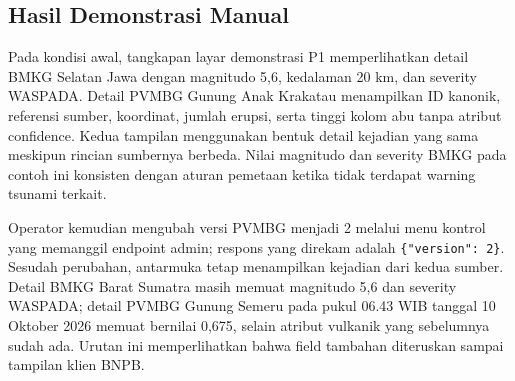 \subsection{Hasil Demonstrasi Manual}
Pada kondisi awal, tangkapan layar demonstrasi P1 memperlihatkan detail BMKG Selatan Jawa dengan magnitudo 5,6, kedalaman 20 km, dan severity WASPADA. Detail PVMBG Gunung Anak Krakatau menampilkan ID kanonik, referensi sumber, koordinat, jumlah erupsi, serta tinggi kolom abu tanpa atribut confidence. Kedua tampilan menggunakan bentuk detail kejadian yang sama meskipun rincian sumbernya berbeda. Nilai magnitudo dan severity BMKG pada contoh ini konsisten dengan aturan pemetaan ketika tidak terdapat warning tsunami terkait.


Operator kemudian mengubah versi PVMBG menjadi 2 melalui menu kontrol yang memanggil endpoint admin; respons yang direkam adalah \verb|{"version": 2}|. Sesudah perubahan, antarmuka tetap menampilkan kejadian dari kedua sumber. Detail BMKG Barat Sumatra masih memuat magnitudo 5,6 dan severity WASPADA; detail PVMBG Gunung Semeru pada pukul 06.43 WIB tanggal 10 Oktober 2026 memuat  bernilai 0,675, selain atribut vulkanik yang sebelumnya sudah ada. Urutan ini memperlihatkan bahwa field tambahan diteruskan sampai tampilan klien BNPB.


